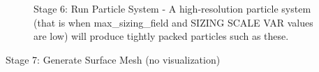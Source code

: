 \documentclass[fleqn,12pt,openany]{book}
\begin{document}
\begin{figure}[h!]
\begin{center}
\end{center}
\caption{\label{fig:MickeyPS}Stage 6: Run Particle System - A high-resolution particle system (that is when max\_sizing\_field and SIZING SCALE VAR values are low) will produce tightly packed particles such as these.}
\end{figure} 
Stage 7: Generate Surface Mesh (no visualization) \\ \\
\end{document}
